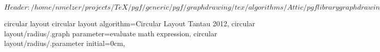 %
%
%

\ProvidesFileRCS[v\pgfversion] $Header: /home/nmelzer/projects/TeX/pgf/generic/pgf/graphdrawing/tex/algorithms/Attic/pgflibrarygraphdrawing.circular.code.tex,v 1.1 2012/04/16 13:20:53 tantau Exp $



%
%
\pgfgddeclarealgorithmkey
  {circular layout}
  {circular layout}
  {
    algorithm=Circular Layout Tantau 2012,
    circular layout/radius/.graph parameter=evaluate math expression,
    circular layout/radius/.parameter initial=0cm,
  }



\endinput